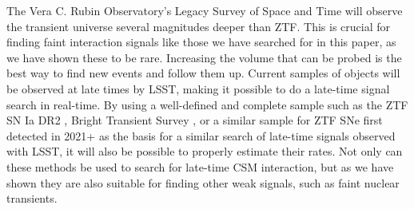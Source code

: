 \documentclass[a4paper,oneside,12pt, class=Latex/Classes/PhDthesisPSnPDF, crop=false]{standalone}
\begin{document}
The Vera C. Rubin Observatory's Legacy Survey of Space and Time \cite[LSST;][]{LSST} will observe the transient universe several magnitudes deeper than ZTF. This is crucial for finding faint interaction signals like those we have searched for in this paper, as we have shown these to be rare. Increasing the volume that can be probed is the best way to find new events and follow them up. Current samples of objects will be observed at late times by LSST, making it possible to do a late-time signal search in real-time. By using a well-defined and complete sample such as the ZTF SN Ia DR2 \citep[][, Smith et al.~in prep.]{DR2_Overview}, Bright Transient Survey \cite[BTS;][]{BTS_I, BTS_II}, or a similar sample for ZTF SNe first detected in 2021+ as the basis for a similar search of late-time signals observed with LSST, it will also be possible to properly estimate their rates. Not only can these methods be used to search for late-time CSM interaction, but as we have shown they are also suitable for finding other weak signals, such as faint nuclear transients.
\end{document}
